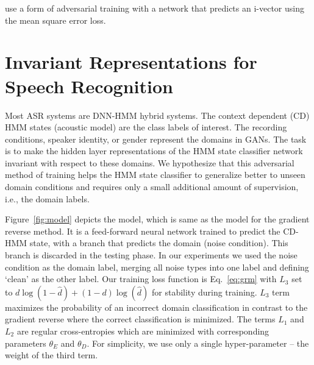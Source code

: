 \documentclass[a4paper]{article}
\begin{document}
    \cite{saon2017english} use a form of adversarial training with a network
    that predicts an i-vector using the mean square error loss.

\section{Invariant Representations for Speech Recognition}
\label{sec:invariant-speech}

Most ASR systems are DNN-HMM hybrid systems. The context dependent (CD) HMM 
states (acoustic model) are the class labels of interest. The
recording conditions, speaker identity, or gender represent the domains in 
GANs. The task is to make the hidden layer representations of the HMM state classifier network 
invariant with respect to these domains. We hypothesize that this adversarial method of
training helps the HMM state classifier to generalize better to unseen domain conditions and requires only a  
small additional amount of supervision, i.e., the domain labels.  

Figure~\ref{fig:model} depicts the model, which is same as the model for the 
gradient reverse method. It is a feed-forward neural network trained to predict 
the CD-HMM state, with a branch that predicts the domain (noise condition). This 
branch is discarded in the testing phase. In our experiments we
used the noise condition as the domain label, merging all noise types into one label
and defining `clean' as the other label. Our training loss function is Eq.~\ref{eq:grm} with 
$L_3$ set to $d\log(1 - \hat{d}) + (1-d)\log(\hat{d})$ for stability during training. 
$L_3$ term maximizes the probability
of an incorrect domain classification in contrast to the gradient reverse where the 
correct classification is minimized.
The terms $L_1$ and $L_2$ are 
regular cross-entropies which are minimized with corresponding parameters $\theta_E$ and $\theta_D$.
For simplicity, we use only a single hyper-parameter -- the weight of the third term.
\end{document}
